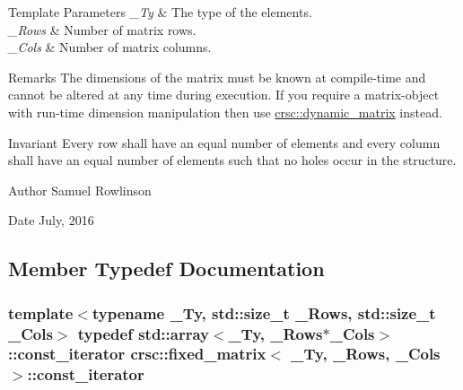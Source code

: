 \begin{DoxyTemplParams}{Template Parameters}
{\em \+\_\+\+Ty} & The type of the elements. \\
\hline
{\em \+\_\+\+Rows} & Number of matrix rows. \\
\hline
{\em \+\_\+\+Cols} & Number of matrix columns. \\
\hline
\end{DoxyTemplParams}
\begin{DoxyRemark}{Remarks}
The dimensions of the matrix must be known at compile-\/time and cannot be altered at any time during execution. If you require a matrix-\/object with run-\/time dimension manipulation then use \hyperlink{classcrsc_1_1dynamic__matrix}{crsc\+::dynamic\+\_\+matrix} instead. 
\end{DoxyRemark}
\begin{DoxyInvariant}{Invariant}
Every row shall have an equal number of elements and every column shall have an equal number of elements such that no holes occur in the structure. 
\end{DoxyInvariant}
\begin{DoxyAuthor}{Author}
Samuel Rowlinson 
\end{DoxyAuthor}
\begin{DoxyDate}{Date}
July, 2016 
\end{DoxyDate}


\subsection{Member Typedef Documentation}
\subsubsection[{\texorpdfstring{const\+\_\+iterator}{const_iterator}}]{\setlength{\rightskip}{0pt plus 5cm}template$<$typename \+\_\+\+Ty, std\+::size\+\_\+t \+\_\+\+Rows, std\+::size\+\_\+t \+\_\+\+Cols$>$ typedef std\+::array$<$\+\_\+\+Ty, \+\_\+\+Rows$\ast$\+\_\+\+Cols$>$\+::{\bf const\+\_\+iterator} {\bf crsc\+::fixed\+\_\+matrix}$<$ \+\_\+\+Ty, \+\_\+\+Rows, \+\_\+\+Cols $>$\+::{\bf const\+\_\+iterator}}\hypertarget{classcrsc_1_1fixed__matrix_a72bc60fb8dc523b5608a9413b8cbad11}{}\label{classcrsc_1_1fixed__matrix_a72bc60fb8dc523b5608a9413b8cbad11}
